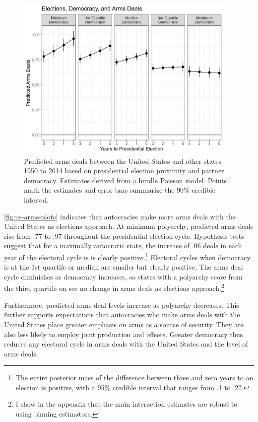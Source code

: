 \documentclass[12pt]{article}
\begin{document}
\begin{figure}[htpb]
	\centering
		\includegraphics[width=0.95\textwidth]{../figures/democ-deals-pred.png}
	\caption{Predicted arms deals between the United States and other states 1950 to 2014 based on presidential election proximity and partner democracy. Estimates derived from a hurdle Poisson model. Points mark the estimates and error bars summarize the 90\% credible interval.}
	\label{fig:democ-deals-pred}
\end{figure}


\autoref{fig:us-arms-plots} indicates that autocracies make more arms deals with the United States as elections approach.
At minimum polyarchy, predicted arms deals rise from .77 to .97 throughout the presidential election cycle.
Hypothesis tests suggest that for a maximally autocratic state, the increase of .06 deals in each year of the electoral cycle is is clearly positive.\footnote{The entire posterior mass of the difference between three and zero years to an election is positive, with a 95\% credible interval that ranges from .1 to .22.}
Electoral cycles when democracy is at the 1st quartile or median are smaller but clearly positive.
The arms deal cycle diminishes as democracy increases, so states with a polyarchy score from the third quartile on see no change in arms deals as elections approach.\footnote{I show in the appendix that the main interaction estimates are robust to using binning estimators.}  


Furthermore, predicted arms deal levels increase as polyarchy decreases. 
This further supports expectations that autocracies who make arms deals with the United States place greater emphasis on arms as a source of security. 
They are also less likely to employ joint production and offsets. 
Greater democracy thus reduces any electoral cycle in arms deals with the United States and the level of arms deals. 
\end{document}
